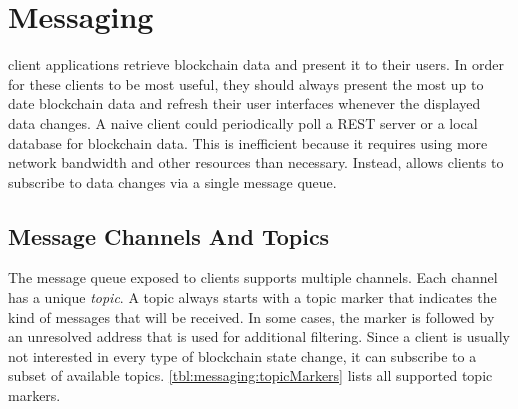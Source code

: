 \section{Messaging}
\label{sec:messaging}

\newcommand{\messagefield}[3]{
	\draw[] (0, #3 + 0.25) node[label=left:\small{#1}]{};
	\draw[draw=black] (0, #3) rectangle (4, #3 + 0.5);
	\draw[] (2, #3 + 0.25) node[label=center:\small{#2}]{};
}


 client applications retrieve blockchain data and present it to their users.
In order for these clients to be most useful, they should always present the most up to date blockchain data and refresh their user interfaces whenever the displayed data changes.
A naive client could periodically poll a REST server or a local database for blockchain data.
This is inefficient because it requires using more network bandwidth and other resources than necessary.
Instead, \codenamespace allows clients to subscribe to data changes via a single message queue.

\subsection{Message Channels And Topics}
\label{sec:messaging:channels}

The \codenamespace message queue exposed to clients supports multiple channels.
Each channel has a unique \emph{topic}.
A topic always starts with a topic marker that indicates the kind of messages that will be received.
In some cases, the marker is followed by an unresolved address that is used for additional filtering.
Since a client is usually not interested in every type of blockchain state change, it can subscribe to a subset of available topics.
\autoref{tbl:messaging:topicMarkers} lists all supported topic markers.

\begin{figure}[H]
	\label{tbl:messaging:topicMarkers}
\end{figure}

